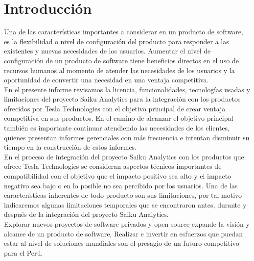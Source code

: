 \clearpage
{}
{}

\chapter*{Introducción}
\begin{spacing}{1.5}
	Una de las características importantes a considerar en un producto de software, es la flexibilidad o nivel de configuración del producto para responder a las existentes y nuevas necesidades de los usuarios. Aumentar el nivel de configuración de un producto de software tiene beneficios directos en el uso de recursos humanos al momento de atender las necesidades de los usuarios y la oportunidad de convertir una necesidad en una ventaja competitiva.\\
	En el presente informe revisamos la licencia, funcionalidades, tecnologías usadas y limitaciones del proyecto Saiku Analytics para la integración con los productos ofrecidos por Tesla Technologies con el objetivo principal de crear ventaja competitiva en sus productos.
	En el camino de alcanzar el objetivo principal también es importante continuar atendiendo las necesidades de los clientes, quienes presentan informes gerenciales con más frecuencia e intentan disminuir su tiempo en la construcción de estos informes.\\
	En el proceso de integración del proyecto Saiku Analytics con los productos que ofrece Tesla Technologies se consideran aspectos técnicos importantes de compatibilidad con el objetivo que el impacto positivo sea alto y el impacto negativo sea bajo o en lo posible no sea percibido por los usuarios. 
	Una de las características inherentes de todo producto son sus limitaciones, por tal motivo indicaremos algunas limitaciones temporales que se encontraron antes, durante y después de la integración del proyecto Saiku Analytics.\\
	Explorar nuevos proyectos de software privados y open source expande la visión y alcance de un producto de software, Realizar e invertir en esfuerzos que puedan estar al nivel de soluciones mundiales son el presagio de un futuro competitivo para el Perú.\\
\end{spacing}
